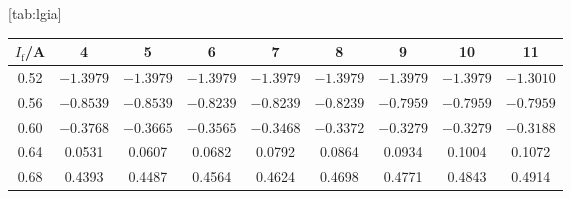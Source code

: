 [tab:lgia]{
\begin{tabular}{ccccccccc}
\toprule
$I_\mathrm{f}$/A & 4 & 5 & 6 & 7 & 8 & 9 & 10 & 11 \\
\midrule
0.52 & $-1.3979$ & $-1.3979$ & $-1.3979$ & $-1.3979$ & $-1.3979$ & $-1.3979$ & $-1.3979$ & $-1.3010$ \\
0.56 & $-0.8539$ & $-0.8539$ & $-0.8239$ & $-0.8239$ & $-0.8239$ & $-0.7959$ & $-0.7959$ & $-0.7959$ \\
0.60 & $-0.3768$ & $-0.3665$ & $-0.3565$ & $-0.3468$ & $-0.3372$ & $-0.3279$ & $-0.3279$ & $-0.3188$ \\
0.64 & 0.0531 & 0.0607 & 0.0682 & 0.0792 & 0.0864 & 0.0934 & 0.1004 & 0.1072 \\
0.68 & 0.4393 & 0.4487 & 0.4564 & 0.4624 & 0.4698 & 0.4771 & 0.4843 & 0.4914 \\
\bottomrule
\end{tabular}}
